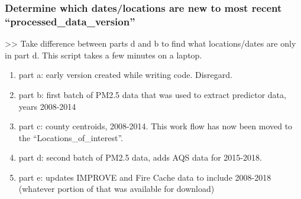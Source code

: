 \begin{enumerate}[nolistsep]



\end{enumerate}

\subsubsection{Determine which dates/locations are new to most recent ``processed\_data\_version'' }

 >> Take difference between parts d and b to find what locations/dates are only in part d. This script takes a few minutes on a laptop. 

\begin{enumerate}[nolistsep]
\item part a: early version created while writing code. Disregard.
\item part b: first batch of PM2.5 data that was used to extract predictor data, years 2008-2014
\item part c: county centroids, 2008-2014. This work flow has now been moved to the ``Locations\_of\_interest''.
\item part d: second batch of PM2.5 data, adds AQS data for 2015-2018.
\item part e: updates IMPROVE and Fire Cache data to include 2008-2018 (whatever portion of that was available for download)
\end{enumerate}

